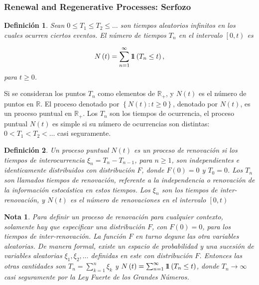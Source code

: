 \documentclass{article}
\newtheorem{Def}{Definición}
\newtheorem{Note}{Nota}
\newcommand{\rea}{\mathbb{R}}
\newcommand{\indora}{\mbox{$1$\hspace{-0.8ex}$1$}}
\begin{document}
%
\subsubsection{Renewal and Regenerative Processes: Serfozo\cite{Serfozo}}
%
\begin{Def}%
Sean $0\leq T_{1}\leq T_{2}\leq \ldots$ son tiempos aleatorios infinitos en los cuales ocurren ciertos eventos. El n\'umero de tiempos $T_{n}$ en el intervalo $\left[0,t\right)$ es

\begin{eqnarray}
N\left(t\right)=\sum_{n=1}^{\infty}\indora\left(T_{n}\leq t\right),
\end{eqnarray}
para $t\geq0$.
\end{Def}

Si se consideran los puntos $T_{n}$ como elementos de $\rea_{+}$, y $N\left(t\right)$ es el n\'umero de puntos en $\rea$. El proceso denotado por $\left\{N\left(t\right):t\geq0\right\}$, denotado por $N\left(t\right)$, es un proceso puntual en $\rea_{+}$. Los $T_{n}$ son los tiempos de ocurrencia, el proceso puntual $N\left(t\right)$ es simple si su n\'umero de ocurrencias son distintas: $0<T_{1}<T_{2}<\ldots$ casi seguramente.

\begin{Def}
Un proceso puntual $N\left(t\right)$ es un proceso de renovaci\'on si los tiempos de interocurrencia $\xi_{n}=T_{n}-T_{n-1}$, para $n\geq1$, son independientes e identicamente distribuidos con distribuci\'on $F$, donde $F\left(0\right)=0$ y $T_{0}=0$. Los $T_{n}$ son llamados tiempos de renovaci\'on, referente a la independencia o renovaci\'on de la informaci\'on estoc\'astica en estos tiempos. Los $\xi_{n}$ son los tiempos de inter-renovaci\'on, y $N\left(t\right)$ es el n\'umero de renovaciones en el intervalo $\left[0,t\right)$
\end{Def}


\begin{Note}
Para definir un proceso de renovaci\'on para cualquier contexto, solamente hay que especificar una distribuci\'on $F$, con $F\left(0\right)=0$, para los tiempos de inter-renovaci\'on. La funci\'on $F$ en turno degune las otra variables aleatorias. De manera formal, existe un espacio de probabilidad y una sucesi\'on de variables aleatorias $\xi_{1},\xi_{2},\ldots$ definidas en este con distribuci\'on $F$. Entonces las otras cantidades son $T_{n}=\sum_{k=1}^{n}\xi_{k}$ y $N\left(t\right)=\sum_{n=1}^{\infty}\indora\left(T_{n}\leq t\right)$, donde $T_{n}\rightarrow\infty$ casi seguramente por la Ley Fuerte de los Grandes N\'umeros.
\end{Note}
\end{document}
